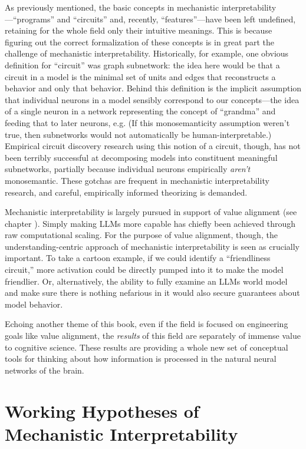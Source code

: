 As previously mentioned, the basic concepts in mechanistic
interpretability---``programs'' and ``circuits'' and, recently,
``features''---have been left undefined, retaining for the whole field only
their intuitive meanings. This is because figuring out the correct
formalization of these concepts is in great part the challenge of mechanistic
interpretability. Historically, for example, one obvious definition for
``circuit'' was graph subnetwork: the idea here would be that a circuit in a
model is the minimal set of units and edges that reconstructs a behavior and
only that behavior. Behind this definition is the implicit assumption that
individual neurons in a model sensibly correspond to our concepts---the idea of
a single neuron in a network representing the concept of ``grandma'' and
feeding that to later neurons, e.g. (If this monosemanticity assumption weren't
true, then subnetworks would not automatically be human-interpretable.)
Empirical circuit discovery research using this notion of a circuit, though,
has not been terribly successful at decomposing models into constituent
meaningful subnetworks, partially because individual neurons empirically
\emph{aren't} monosemantic. These gotchas are frequent in mechanistic
interpretability research, and careful, empirically informed theorizing is
demanded.

Mechanistic interpretability is largely pursued in support of value alignment
(see chapter ). Simply making LLMs more capable has
chiefly been achieved through raw computational scaling. For the purpose of
value alignment, though, the understanding-centric approach of mechanistic
interpretability is seen as crucially important. To take a cartoon example, if
we could identify a ``friendliness circuit,'' more activation could be directly
pumped into it to make the model friendlier. Or, alternatively, the ability to
fully examine an LLMs world model and make sure there is nothing nefarious in
it would also secure guarantees about model behavior.

Echoing another theme of this book, even if the field is focused on engineering
goals like value alignment, the \emph{results} of this field are separately of
immense value to cognitive science. These results are providing a whole new set
of conceptual tools for thinking about how information is processed in the
natural neural networks of the brain.

\section{Working Hypotheses of Mechanistic Interpretability}

